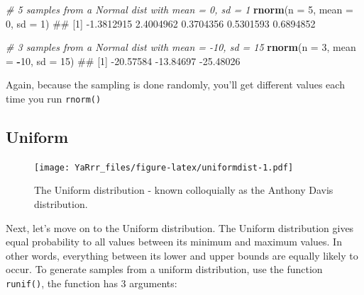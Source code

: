 \documentclass[]{book}
\newenvironment{Shaded}{\begin{snugshade}}{\end{snugshade}}
\newcommand{\KeywordTok}[1]{\textcolor[rgb]{0.13,0.29,0.53}{\textbf{#1}}}
\newcommand{\DataTypeTok}[1]{\textcolor[rgb]{0.13,0.29,0.53}{#1}}
\newcommand{\DecValTok}[1]{\textcolor[rgb]{0.00,0.00,0.81}{#1}}
\newcommand{\CommentTok}[1]{\textcolor[rgb]{0.56,0.35,0.01}{\textit{#1}}}
\newcommand{\OperatorTok}[1]{\textcolor[rgb]{0.81,0.36,0.00}{\textbf{#1}}}
\newcommand{\NormalTok}[1]{#1}
\theoremstyle{definition}
\theoremstyle{definition}
\theoremstyle{remark}
\begin{document}
\begin{Shaded}
\begin{Highlighting}[]
\CommentTok{# 5 samples from a Normal dist with mean = 0, sd = 1}
\KeywordTok{rnorm}\NormalTok{(}\DataTypeTok{n =} \DecValTok{5}\NormalTok{, }\DataTypeTok{mean =} \DecValTok{0}\NormalTok{, }\DataTypeTok{sd =} \DecValTok{1}\NormalTok{)}
\NormalTok{## [1] -1.3812915  2.4004962  0.3704356  0.5301593  0.6894852}

\CommentTok{# 3 samples from a Normal dist with mean = -10, sd = 15}
\KeywordTok{rnorm}\NormalTok{(}\DataTypeTok{n =} \DecValTok{3}\NormalTok{, }\DataTypeTok{mean =} \OperatorTok{-}\DecValTok{10}\NormalTok{, }\DataTypeTok{sd =} \DecValTok{15}\NormalTok{)}
\NormalTok{## [1] -20.57584 -13.84697 -25.48026}
\end{Highlighting}
\end{Shaded}

Again, because the sampling is done randomly, you'll get different
values each time you run \texttt{rnorm()}

\subsection{Uniform}\label{uniform}

\begin{figure}
\centering
\texttt{[image: YaRrr\_files/figure-latex/uniformdist-1.pdf]}
\caption{\label{fig:uniformdist}The Uniform distribution - known
colloquially as the Anthony Davis distribution.}
\end{figure}

Next, let's move on to the Uniform distribution. The Uniform
distribution gives equal probability to all values between its minimum
and maximum values. In other words, everything between its lower and
upper bounds are equally likely to occur. To generate samples from a
uniform distribution, use the function \texttt{runif()}, the function
has 3 arguments:
\end{document}
